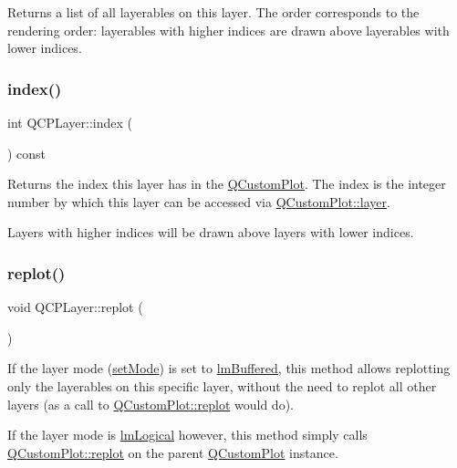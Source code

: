 Returns a list of all layerables on this layer. The order corresponds to the rendering order\+: layerables with higher indices are drawn above layerables with lower indices. \mbox{\label{class_q_c_p_layer_ad322905c4700dcc7ceba63e011c730d2}} 
\subsubsection{\texorpdfstring{index()}{index()}}
{\footnotesize\ttfamily int Q\+C\+P\+Layer\+::index (\begin{DoxyParamCaption}{ }\end{DoxyParamCaption}) const\hspace{0.3cm}{\ttfamily [inline]}}

Returns the index this layer has in the \mbox{\hyperlink{class_q_custom_plot}{Q\+Custom\+Plot}}. The index is the integer number by which this layer can be accessed via \mbox{\hyperlink{class_q_custom_plot_a0a96244e7773b242ef23c32b7bdfb159}{Q\+Custom\+Plot\+::layer}}.

Layers with higher indices will be drawn above layers with lower indices. \mbox{\label{class_q_c_p_layer_adefd53b6db02f470151c416f42e37180}} 
\subsubsection{\texorpdfstring{replot()}{replot()}}
{\footnotesize\ttfamily void Q\+C\+P\+Layer\+::replot (\begin{DoxyParamCaption}{ }\end{DoxyParamCaption})}

If the layer mode (\mbox{\hyperlink{class_q_c_p_layer_a938d57b04f4e4c23cedf1711f983919b}{set\+Mode}}) is set to \mbox{\hyperlink{class_q_c_p_layer_a67dcfc1590be2a1f2227c5a39bb59c7cab581b9fab3007c4c65f057f4185d7538}{lm\+Buffered}}, this method allows replotting only the layerables on this specific layer, without the need to replot all other layers (as a call to \mbox{\hyperlink{class_q_custom_plot_aa4bfe7d70dbe67e81d877819b75ab9af}{Q\+Custom\+Plot\+::replot}} would do).

If the layer mode is \mbox{\hyperlink{class_q_c_p_layer_a67dcfc1590be2a1f2227c5a39bb59c7ca02eb5e9a4cb7f1baf1e2b6b99e3b87ce}{lm\+Logical}} however, this method simply calls \mbox{\hyperlink{class_q_custom_plot_aa4bfe7d70dbe67e81d877819b75ab9af}{Q\+Custom\+Plot\+::replot}} on the parent \mbox{\hyperlink{class_q_custom_plot}{Q\+Custom\+Plot}} instance.

